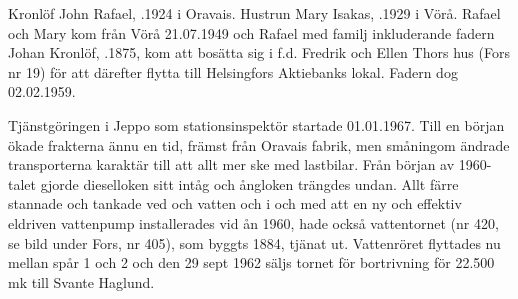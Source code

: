  Kronlöf John Rafael, .1924 i Oravais. Hustrun Mary Isakas, .1929 i Vörå. Rafael och Mary kom från Vörå 21.07.1949 och Rafael med familj inkluderande fadern Johan Kronlöf, .1875, kom att bosätta sig i f.d. Fredrik och Ellen Thors hus (Fors nr 19) för att därefter flytta till Helsingfors Aktiebanks lokal. Fadern dog 02.02.1959.

Tjänstgöringen i Jeppo som stationsinspektör startade 01.01.1967. Till en början ökade frakterna ännu en tid, främst från Oravais fabrik,  men småningom ändrade transporterna karaktär till att allt mer ske med lastbilar. Från början av 1960-talet gjorde dieselloken sitt intåg och ångloken trängdes undan. Allt färre stannade och tankade ved och vatten och i och med att en ny och effektiv eldriven vattenpump installerades vid ån 1960, hade också vattentornet (nr 420, se bild under Fors, nr 405), som byggts 1884, tjänat ut. Vattenröret flyttades nu mellan spår 1 och 2 och den 29 sept 1962 säljs tornet för bortrivning för 22.500 mk till Svante Haglund.

